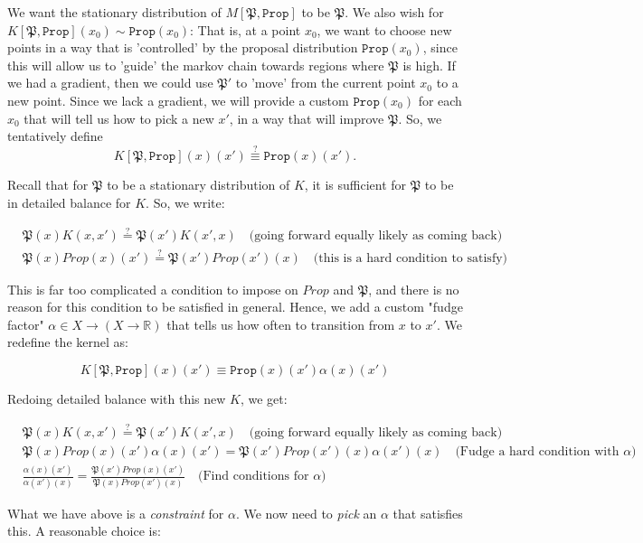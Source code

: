 \documentclass[titlepage]{article}
\newcommand{\R}{\mathbb{R}}
\renewcommand{\P}{\mathfrak{P}}
\newcommand{\Prop}{\texttt{Prop}}
\begin{document}
We want the stationary distribution of $M[\P, \Prop]$ to be $\P$. We also
wish for $K[\P, \Prop](x_0) \sim \Prop(x_0)$: That is, at a point $x_0$, we want
to choose new points in a way that is 'controlled' by the proposal distribution
$\Prop(x_0)$, since this will allow us to 'guide' the markov chain towards regions where $\P$ is high.
If we had a gradient, then we could use $\P'$ to 'move' from the current point
$x_0$ to a new point. Since we lack a gradient, we will provide a custom
$\Prop(x_0)$ for each $x_0$ that will tell us how to pick a new $x'$, in
a way that will improve $\P$.  So, we tentatively define
$$K[\P, \Prop](x)(x') \stackrel{?}{\equiv} \Prop(x)(x').$$

Recall that for $\P$ to be a stationary distribution of $K$, it is sufficient
for $\P$ to be in detailed balance for $K$. So, we write:

\begin{align*}
&\P(x) K(x, x') \stackrel{?}{=}  \P(x') K(x', x) \quad \text{(going forward equally likely as coming back)} \\
&\P(x) Prop(x)(x') \stackrel{?}{=} \P(x') Prop(x')(x) \quad \text{(this is a hard condition to satisfy)}
\end{align*}

This is far too complicated a condition to impose on $Prop$ and $\P$, and there
is no reason for this condition to be satisfied in general. Hence,
we add a custom "fudge factor" $\alpha \in X \rightarrow (X \rightarrow \R)$
that tells us how often to transition
from $x$ to $x'$. We redefine the kernel as:

$$
K[\P, \Prop](x)(x') \equiv \Prop(x)(x') \alpha(x)(x')
$$

Redoing detailed balance with this new $K$, we get:

\begin{align*}
&\P(x) K(x, x') \stackrel{?}{=}  \P(x') K(x', x) \quad \text{(going forward equally likely as coming back)} \\
&\P(x) Prop(x)(x') \alpha(x)(x') = \P(x') Prop(x')(x) \alpha(x')(x) \quad \text{(Fudge a hard condition with $\alpha$)} \\
&\frac{\alpha(x)(x')}{\alpha(x')(x)} = \frac{\P(x') Prop(x)(x') }{\P(x) Prop(x')(x)} \quad \text{(Find conditions for $\alpha$)}
\end{align*}

What we have above is a \emph{constraint} for $\alpha$. We now need to \emph{pick}
an $\alpha$ that satisfies this. A reasonable choice is:
\end{document}
